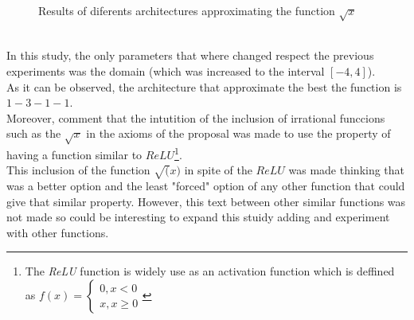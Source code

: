 \documentclass[a4paper, 11pt]{article}
\begin{document}
\begin{figure}[h]
    \hspace{1em}
    \caption{Results of diferents architectures approximating the function $\sqrt{x}$}
    \label{sqrt100}
\end{figure}\\
In this study, the only parameters that where changed respect the previous experiments was the domain (which was increased to the interval $[-4,4]$).\\
As it can be observed, the architecture that approximate the best the function is $1-3-1-1$.\\
Moreover, comment that the intutition of the inclusion of irrational funccions such as the $\sqrt{x}$ in the axioms of the proposal was made to use the property of having a function similar to $ReLU$\footnote{The \textit{ReLU} function is widely use as an activation function which is deffined as $f(x) = \left\{ \begin{matrix} 0, x < 0 \\ x, x\geq 0\end{matrix} \right.$}.\\
This inclusion of the function $\sqrt(x)$ in spite of the $ReLU$ was made thinking that was a better option and the least "forced" option of any other function that could give that similar property. However, this text between other similar functions was not made so could be interesting to expand this stuidy adding and experiment with other functions.
\end{document}
